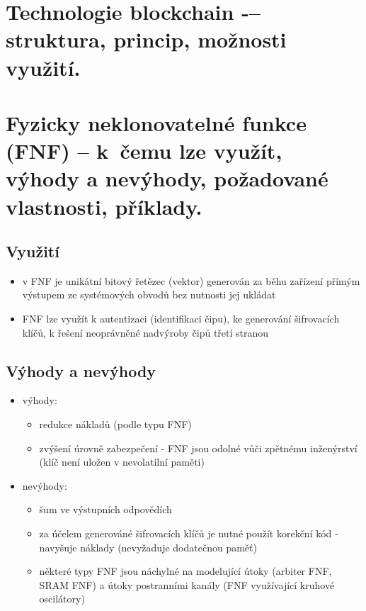 \clearpage
\section{Technologie blockchain -– struktura, princip, možnosti využití.}

\clearpage
\section{Fyzicky neklonovatelné funkce (FNF) -- k~čemu lze využít, výhody a nevýhody, požadované vlastnosti, příklady.}
\subsection{Využití}
\begin{itemize}
    \item v FNF je unikátní bitový řetězec (vektor) generován za běhu zařízení přímým výstupem ze systémových obvodů bez nutnosti jej ukládat
    \item FNF lze využít k autentizaci (identifikaci čipu), ke generování šifrovacích klíčů, k řešení neoprávněné nadvýroby čipů třetí stranou
\end{itemize}

\subsection{Výhody a nevýhody}
\begin{itemize}
    \item výhody:
    \begin{itemize}
        \item redukce nákladů (podle typu FNF)
        \item zvýšení úrovně zabezpečení - FNF jsou odolné vůči zpětnému inženýrství (klíč není uložen v nevolatilní paměti)
    \end{itemize}
    \item nevýhody:
    \begin{itemize}
        \item šum ve výstupních odpovědích
        \item za účelem generováné šifrovacích klíčů je nutné použít korekční kód - navyšuje náklady (nevyžaduje dodatečnou paměť)
        \item některé typy FNF jsou náchylné na modelující útoky (arbiter FNF, SRAM FNF) a útoky postranními kanály (FNF využívající kruhové oscilátory)
    \end{itemize}
\end{itemize}

